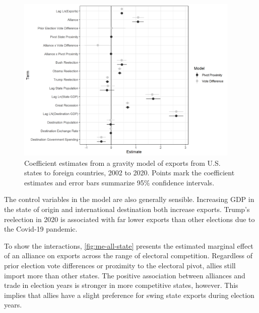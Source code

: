\documentclass[12pt]{article}
\begin{document}
\begin{figure}[htpb]
	\centering
		\includegraphics[width=0.95\textwidth]{../figures/state-model-coefs.png}
	\caption{Coefficient estimates from a gravity model of exports from U.S. states to foreign countries, 2002 to 2020. Points mark the coefficient estimates and error bars summarize 95\% confidence intervals.}
	\label{fig:state-model-coefs}
\end{figure}


The control variables in the model are also generally sensible. 
Increasing GDP in the state of origin and international destination both increase exports. 
Trump's reelection in 2020 is associated with far lower exports than other elections due to the Covid-19 pandemic. 


To show the interactions, \autoref{fig:me-all-state} presents the estimated marginal effect of an alliance on exports across the range of electoral competition. 
Regardless of prior election vote differences or proximity to the electoral pivot, allies still import more than other states.
The positive association between alliances and trade in election years is stronger in more competitive states, however. 
This implies that allies have a slight preference for swing state exports during election years. 
\end{document}
